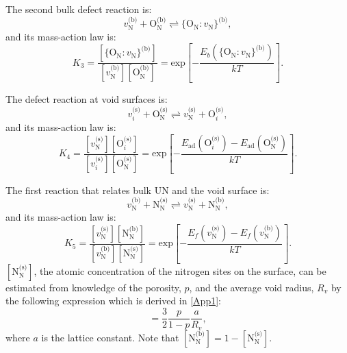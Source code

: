 \documentclass[preprint,12pt,sort&compress]{elsarticle}
\newcommand{\?}{\stackrel{?}{=}}
\begin{document}
The second bulk defect reaction is:
\begin{equation}
v_\text{N}^\text{(b)} + \text{O}_\text{N}^\text{(b)} \rightleftharpoons \{\text{O}_\text{N} \! : \! v_\text{N}\}^\text{(b)},
\end{equation}
and its mass-action law is:
\begin{equation}
K_3 = \frac{ [ \{\text{O}_\text{N} \! : \! v_\text{N}\}^\text{(b)} ] }{ [ v_\text{N}^\text{(b)} ] [ \text{O}_\text{N}^\text{(b)} ] } = \text{exp}\! \left[ - \frac{ E_b( \{\text{O}_\text{N} \! : \! v_\text{N}\}^\text{(b)} ) }{ k T } \right].
\end{equation}

The defect reaction at void surfaces is:
\begin{equation}
v_i^\text{(s)} + \text{O}_\text{N}^\text{(s)}  \rightleftharpoons  v_\text{N}^\text{(s)} + \text{O}_i^\text{(s)},
\end{equation}
and its mass-action law is:
\begin{equation}
K_4 = \frac{ [ v_\text{N}^\text{(s)} ]  [ \text{O}_i^\text{(s)} ] }{ [ v_i^\text{(s)} ] [ \text{O}_\text{N}^\text{(s)} ] } = \text{exp}\! \left[ - \frac{ E_\text{ad}( \text{O}_i^\text{(s)} ) - E_\text{ad}( \text{O}_\text{N}^\text{(s)} ) }{ k T } \right].
\end{equation}

The first reaction that relates bulk UN and the void surface is:
\begin{equation}
v_\text{N}^\text{(b)} + \text{N}_\text{N}^\text{(s)}  \rightleftharpoons v_\text{N}^\text{(s)} + \text{N}_\text{N}^\text{(b)},
\end{equation}
and its mass-action law is:
\begin{equation}
K_5 = \frac{ [ v_\text{N}^\text{(s)} ]  [ \text{N}_\text{N}^\text{(b)} ] }{ [ v_\text{N}^\text{(b)} ] [ 
\text{N}_\text{N}^\text{(s)} ] } = \text{exp}\! \left[ - \frac{ E_f ( v_\text{N}^\text{(s)} ) - E_f ( v_\text{N}^\text{(b)} ) }{ k T } \right].
\label{Eq:VN-VNs}
\end{equation}
$[ \text{N}_\text{N}^\text{(s)} ]$, the atomic concentration of the nitrogen sites on the surface, can be estimated from knowledge of the porosity, $p$, and the average void radius, $R_v$ by the following expression which is derived in \ref{App1}:
\begin{equation}
[ \text{N}_\text{N}^\text{(s)} ] = \frac{3}{2} \frac{p}{1-p} \frac{a}{R_v},
\label{Eq:NNs1}
\end{equation}
where $a$ is the lattice constant. Note that $[ \text{N}_\text{N}^\text{(b)} ] = 1 - [ \text{N}_\text{N}^\text{(s)} ]$. 
\end{document}
